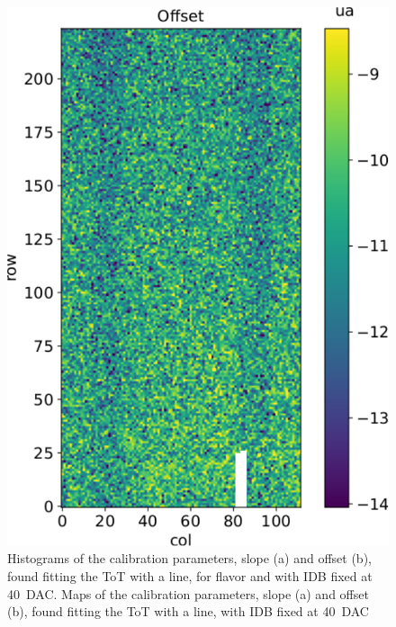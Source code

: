\begin{figure}[h!]
            \includegraphics[width=.49\linewidth]{figures/charaterization/offset_map.pdf}
            \caption{Histograms of the calibration parameters, slope (a) and offset (b), found fitting the ToT with a line, for  flavor and with IDB fixed at \SI{40}{DAC}. Maps of the calibration parameters, slope (a) and offset (b), found fitting the ToT with a line, with IDB fixed at \SI{40}{DAC}}
            \label{fig:ToT_histograms_all_fl}
        \end{figure} 

    
